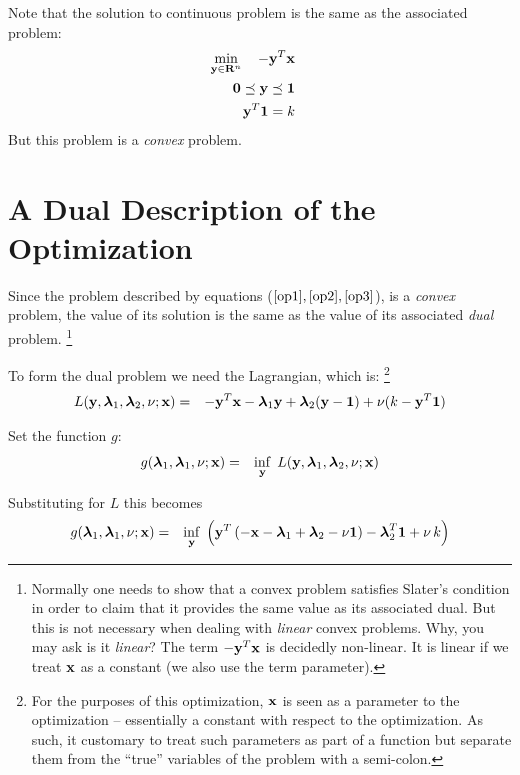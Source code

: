 \documentclass[12pt]{article}
\begin{document}
Note that the solution to continuous problem is the same as the associated problem:
\begin{eqnarray}
	\mathop{\rm min}_{{\bf y} \in {\bf R}^n}\limits \quad -{\bf y}^T {\bf x} && \label{op1} \\ 
	{\bf 0} \preceq {\bf y} \preceq {\bf 1} &&  \label{op2}\\
	{\bf y}^T {\bf 1} =  k \label{op3} &&
\end{eqnarray}
But this problem is a {\it convex\/} problem.

\section{A Dual Description of the Optimization}
Since the problem described by equations ($\ref{op1}, \ref{op2}, \ref{op3}$), is
a {\it convex\/} problem, the value of its solution is the same as the value of 
its associated {\it dual\/} problem.%
\footnote{Normally one needs to show that a convex problem satisfies Slater's condition
	in order to claim that it provides the same value as its associated dual.
But this is not necessary when dealing with {\it linear\/} convex problems. 
Why, you may ask is it {\it linear\/}? The term $-{\bf y}^T {\bf x}$ is
decidedly non-linear. It is linear if we treat ${\bf x}$ as a constant (we also
use the term parameter).}

To form the dual problem we need the Lagrangian, which is:%
\footnote{For the purposes of this optimization, ${\bf x}$ is seen as a parameter
to the optimization -- essentially a constant with respect to the optimization.
As such, it customary to treat such parameters as part of a function but separate
them from the ``true'' variables of the problem with a semi-colon.}
\begin{eqnarray}
	L({\bf y}, {\boldsymbol \lambda}_1, {\boldsymbol \lambda}_2, \nu; {\bf x}) &=& -{\bf y}^T {\bf x} - {\boldsymbol \lambda}_1 {\bf y} + {\boldsymbol \lambda}_2 ({\bf y} - {\bf 1}) + \nu (k - {\bf y}^T {\bf 1}) 
\end{eqnarray}

Set the function $g$:
\begin{eqnarray}
	g({\boldsymbol \lambda}_1, {\boldsymbol \lambda}_1, \nu; {\bf x}) &=& \mathop{\rm inf}_{\bf y} \; L({\bf y}, {\boldsymbol \lambda}_1, {\boldsymbol \lambda}_2, \nu; {\bf x}) 
\end{eqnarray}

Substituting for $L$ this becomes
\begin{eqnarray}
	g({\boldsymbol \lambda}_1, {\boldsymbol \lambda}_1, \nu; {\bf x}) &=& \mathop{\rm inf}_{\bf y} \; \left({\bf y}^T \left( -{\bf x} - {\boldsymbol \lambda}_1 + {\boldsymbol \lambda}_2 - \nu {\bf 1} \right) - {\boldsymbol \lambda}_2^T {\bf 1} + \nu \, k  \right)
\end{eqnarray}
\end{document}
